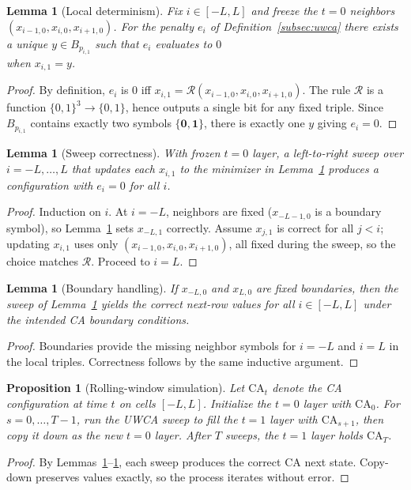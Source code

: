 \documentclass[12pt]{article}
\newtheorem{lemma}[theorem]{Lemma}
\newtheorem{proposition}[theorem]{Proposition}
\numberwithin{equation}{section}
\begin{document}
\begin{lemma}[Local determinism]\label{lem:uwca-localdet}
Fix $i\in[-L,L]$ and freeze the $t{=}0$ neighbors $(x_{i-1,0},x_{i,0},x_{i+1,0})$. For the penalty $e_i$ of Definition~\ref{subsec:uwca} there exists a \emph{unique} $y\in B_{p_{i,1}}$ such that $e_i$ evaluates to $0$\\ when $x_{i,1}=y$.
\end{lemma}
\begin{proof}
By definition, $e_i$ is $0$ iff $x_{i,1}=\mathcal{R}(x_{i-1,0},x_{i,0},x_{i+1,0})$. The rule $\mathcal{R}$ is a function $\{0,1\}^3\to\{0,1\}$, hence outputs a single bit for any fixed triple. Since $B_{p_{i,1}}$ contains exactly two symbols $\{\mathbf{0},\mathbf{1}\}$, there is exactly one $y$ giving $e_i=0$.
\end{proof}

\begin{lemma}[Sweep correctness]\label{lem:uwca-sweep}
With frozen $t{=}0$ layer, a left-to-right sweep over $i=-L,\dots,L$ that updates each $x_{i,1}$ to the minimizer in Lemma~\ref{lem:uwca-localdet} produces a configuration with $e_i=0$ for all $i$.
\end{lemma}
\begin{proof}
Induction on $i$. At $i=-L$, neighbors are fixed ($x_{-L-1,0}$ is a boundary symbol), so Lemma~\ref{lem:uwca-localdet} sets $x_{-L,1}$ correctly. Assume $x_{j,1}$ is correct for all $j<i$; updating $x_{i,1}$ uses only $(x_{i-1,0},x_{i,0},x_{i+1,0})$, all fixed during the sweep, so the choice matches $\mathcal{R}$. Proceed to $i=L$.
\end{proof}

\begin{lemma}[Boundary handling]\label{lem:uwca-boundary}
If $x_{-L,0}$ and $x_{L,0}$ are fixed boundaries, then the sweep of Lemma~\ref{lem:uwca-sweep} yields the correct next-row values for all $i\in[-L,L]$ under the intended CA boundary conditions.
\end{lemma}
\begin{proof}
Boundaries provide the missing neighbor symbols for $i=-L$ and $i=L$ in the local triples. Correctness follows by the same inductive argument.
\end{proof}

\begin{proposition}[Rolling-window simulation]\label{prop:uwca-roll}
Let $\mathrm{CA}_t$ denote the CA configuration at time $t$ on cells $[-L,L]$. Initialize the $t{=}0$ layer with $\mathrm{CA}_0$. For $s=0,\dots,T-1$, run the UWCA sweep to fill the $t{=}1$ layer with $\mathrm{CA}_{s+1}$, then copy it down as the new $t{=}0$ layer. After $T$ sweeps, the $t{=}1$ layer holds $\mathrm{CA}_T$.
\end{proposition}
\begin{proof}
By Lemmas~\ref{lem:uwca-localdet}–\ref{lem:uwca-boundary}, each sweep produces the correct CA next state. Copy-down preserves values exactly, so the process iterates without error.
\end{proof}
\end{document}
